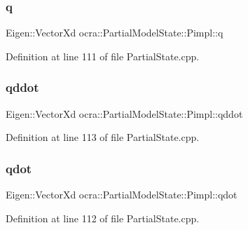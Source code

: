 \subsubsection{\texorpdfstring{q}{q}}
{\footnotesize\ttfamily Eigen\+::\+Vector\+Xd ocra\+::\+Partial\+Model\+State\+::\+Pimpl\+::q}



Definition at line 111 of file Partial\+State.\+cpp.

\hypertarget{structocra_1_1PartialModelState_1_1Pimpl_a5a7b9332901dfbde222881933efe9a0d}{}\label{structocra_1_1PartialModelState_1_1Pimpl_a5a7b9332901dfbde222881933efe9a0d} 
\subsubsection{\texorpdfstring{qddot}{qddot}}
{\footnotesize\ttfamily Eigen\+::\+Vector\+Xd ocra\+::\+Partial\+Model\+State\+::\+Pimpl\+::qddot}



Definition at line 113 of file Partial\+State.\+cpp.

\hypertarget{structocra_1_1PartialModelState_1_1Pimpl_afaef50e83183344243397f3001f25c26}{}\label{structocra_1_1PartialModelState_1_1Pimpl_afaef50e83183344243397f3001f25c26} 
\subsubsection{\texorpdfstring{qdot}{qdot}}
{\footnotesize\ttfamily Eigen\+::\+Vector\+Xd ocra\+::\+Partial\+Model\+State\+::\+Pimpl\+::qdot}



Definition at line 112 of file Partial\+State.\+cpp.

\hypertarget{structocra_1_1PartialModelState_1_1Pimpl_a74798b71925f4049758733f78a6cd571}{}\label{structocra_1_1PartialModelState_1_1Pimpl_a74798b71925f4049758733f78a6cd571} 
